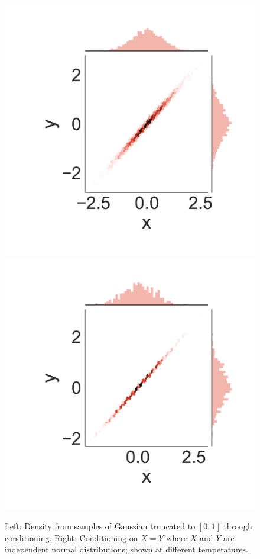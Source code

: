 \begin{figure}[!htb]
\begin{minipage}{0.45\linewidth}
	\includegraphics[width=.45\linewidth, trim={1.7cm, 1.6cm, 1.3cm, 1.5cm}, clip]{figures/100-0}
	\includegraphics[width=.45\linewidth, trim={1.7cm, 1.6cm, 1.3cm, 1.5cm}, clip]{figures/1000-0}				
	
	\end{minipage}
	\caption{Left: Density from samples of Gaussian truncated to $[0, 1]$ through conditioning. Right: Conditioning on $X = Y$ where $X$ and $Y$ are independent normal distributions; shown at different temperatures.}
	\label{fig:density}
\end{figure}


